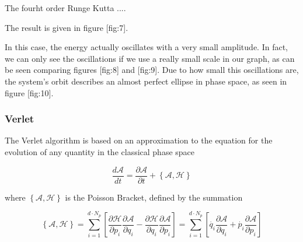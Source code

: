 The fourht order Runge Kutta ....

The result is given in figure [fig:7].


In this case, the energy actually oscillates with a very small amplitude. In fact, we can only see the oscillations if we use a really small scale in our graph, as can be seen comparing figures [fig:8] and [fig:9]. Due to how small this oscillations are, the system's orbit describes an almost perfect ellipse in phase space, as seen in figure [fig:10].




\subsubsection{Verlet}

The Verlet algorithm is based on an approximation to the equation for the evolution of any quantity in the classical phase space

$$\frac{d \mathcal{A}}{dt} = \frac{\partial \mathcal{A}}{\partial t} + \left\{\mathcal{A}, \mathcal{H} \right\}$$

where $\left\{\mathcal{A}, \mathcal{H} \right\}$ is the Poisson Bracket, defined by the summation

$$\left\{\mathcal{A}, \mathcal{H} \right\} = \sum_{i=1}^{d\cdot N_p} \left[ \frac{\partial \mathcal{H}}{\partial p_i}\frac{\partial \mathcal{A}}{\partial q_i} - \frac{\partial \mathcal{H}}{\partial q_i}\frac{\partial \mathcal{A}}{\partial p_i}\right] = \sum_{i=1}^{d\cdot N_p} \left[ \Dot{q_i} \frac{\partial \mathcal{A}}{\partial q_i} + \Dot{p_i}\frac{\partial \mathcal{A}}{\partial p_i}\right]$$

